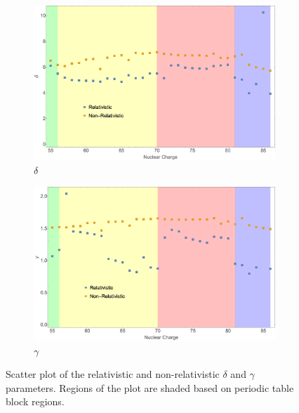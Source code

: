 \begin{figure}
\centering
\begin{subfigure}[b]{0.49\textwidth}
	\includegraphics[width=\textwidth]{Figures/BS_rel_delta.png}
	\caption{$\delta$}
\end{subfigure}
\begin{subfigure}[b]{0.49\textwidth}
	\includegraphics[width=\textwidth]{Figures/BS_rel_gamma.png}
	\caption{$\gamma$}
\end{subfigure}	
\caption[Scatter plot of the relativistic and non-relativistic $\delta$ and $\gamma$ parameters.]{Scatter plot of the relativistic and non-relativistic $\delta$ and $\gamma$ parameters. Regions of the plot are shaded based on periodic table block regions.}
\label{fig:BS_rel_delt_gamm}
\end{figure}

